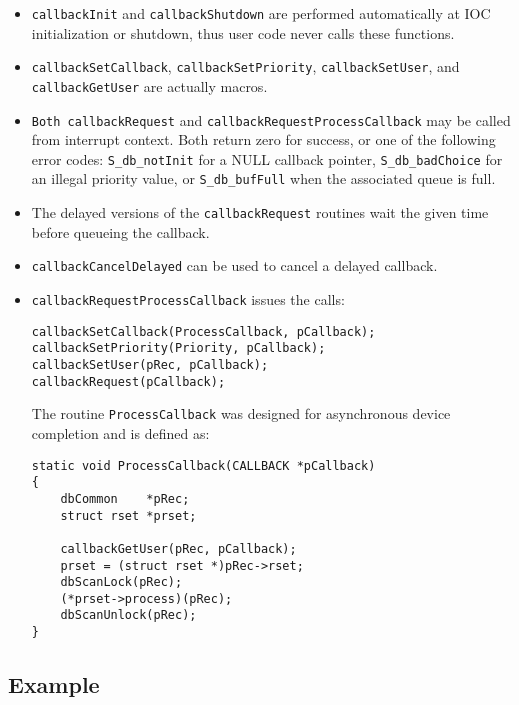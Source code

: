 \begin{itemize}
\item \verb|callbackInit| and \verb|callbackShutdown| are performed automatically at IOC initialization or shutdown,
thus user code never calls these functions.

\item \verb|callbackSetCallback|, \verb|callbackSetPriority|, \verb|callbackSetUser|, and \verb|callbackGetUser| are 
actually macros.

\item \verb|Both callbackRequest| and \verb|callbackRequestProcessCallback| may be called from interrupt context. Both return zero for success, or one of the following error codes: \verb|S_db_notInit| for a NULL callback pointer, \verb|S_db_badChoice| for an illegal priority value, or \verb|S_db_bufFull| when the associated queue is full.

\item The delayed versions of the \verb|callbackRequest| routines wait the given time before queueing the callback.

\item \verb|callbackCancelDelayed| can be used to cancel a delayed callback.

\item \verb|callbackRequestProcessCallback| issues the calls:

\begin{verbatim}
callbackSetCallback(ProcessCallback, pCallback);
callbackSetPriority(Priority, pCallback);
callbackSetUser(pRec, pCallback);
callbackRequest(pCallback);
\end{verbatim}

The routine \verb|ProcessCallback| was designed for asynchronous device completion and is defined as:

\begin{verbatim}
static void ProcessCallback(CALLBACK *pCallback)
{
    dbCommon    *pRec;
    struct rset *prset;
 
    callbackGetUser(pRec, pCallback);
    prset = (struct rset *)pRec->rset;
    dbScanLock(pRec);
    (*prset->process)(pRec);
    dbScanUnlock(pRec);
}
\end{verbatim}

\end{itemize}

\subsection{Example}

